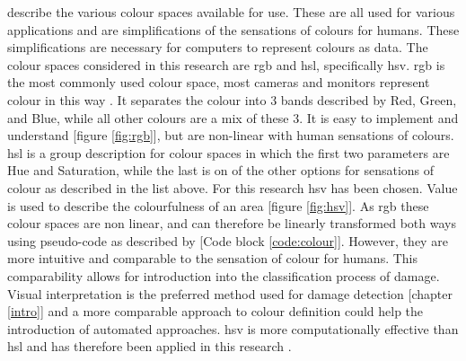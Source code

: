 \noindent\citet{ford1998colour} describe the various colour spaces available for use. These are all used for various applications and are simplifications of the sensations of colours for humans. These simplifications are necessary for computers to represent colours as data. The colour spaces considered in this research are \ac{rgb} and \ac{hsl}, specifically \ac{hsv}. \ac{rgb} is the most commonly used colour space, most cameras and monitors represent colour in this way \citep{ford1998colour}. It separates the colour into 3 bands described by Red, Green, and Blue, while all other colours are a mix of these 3. It is easy to implement and understand [figure \ref{fig:rgb}], but are non-linear with human sensations of colours. \ac{hsl} is a group description for colour spaces in which the first two parameters are Hue and Saturation, while the last is on of the other options for sensations of colour as described in the list above. For this research \ac{hsv} has been chosen. Value is used to describe the colourfulness of an area [figure \ref{fig:hsv}]. As \ac{rgb} these colour spaces are non linear, and can therefore be linearly transformed both ways using pseudo-code as described by \citet{schwarz1987} [Code block \ref{code:colour}]. However, they are more intuitive and comparable to the sensation of colour for humans. This comparability allows for introduction into the classification process of damage. Visual interpretation is the preferred method used for damage detection [chapter \ref{intro}] and a more comparable approach to colour definition could help the introduction of automated approaches. \ac{hsv} is more computationally effective than \ac{hsl} and has therefore been applied in this research \citep{schwarz1987}.\\

